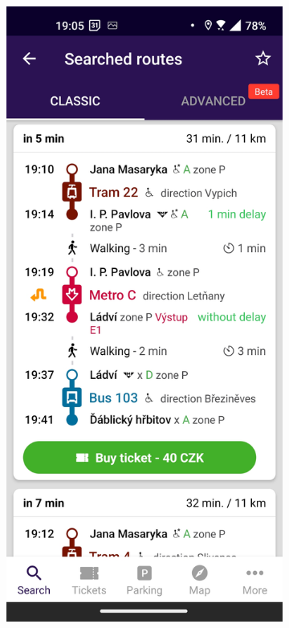 \begin{figure}[h!]
  \begin{subfigure}{.45\textwidth}
  \centering
    \includegraphics[width=\linewidth]{img/screenshots/pid_litacka_result_simple.jpg}

\end{subfigure}
\end{figure}

